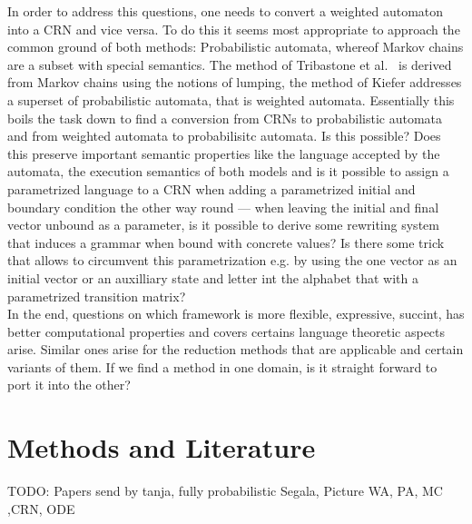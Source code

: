 \documentclass[11pt, rgb]{scrartcl}
\begin{document}
In order to address this questions, one needs to convert a weighted automaton into a CRN and vice versa. To do this it seems most appropriate to approach the common ground of both methods: Probabilistic automata, whereof Markov chains are a subset with special semantics. The method of Tribastone et al.~\autocite{Cardelli2017MaximalAO} is derived from Markov chains using the notions of lumping, the method of Kiefer addresses a superset of probabilistic automata, that is weighted automata. Essentially this boils the task down to find a conversion from CRNs to probabilistic automata and from weighted automata to probabilisitc automata. Is this possible? Does this preserve important semantic properties like the language accepted by the automata, the execution semantics of both models and is it possible to assign a parametrized language to a CRN when adding a parametrized initial and boundary condition the other way round --- when leaving the initial and final vector unbound as a parameter, is it possible to derive some rewriting system that induces a grammar when bound with concrete values? Is there some trick that allows to circumvent this parametrization e.g. by using the one vector as an initial vector or an auxilliary state and letter int the alphabet that with a parametrized transition matrix? \\

In the end, questions on which framework is more flexible, expressive, succint, has better computational properties and covers certains language theoretic aspects arise. Similar ones arise for the reduction methods that are applicable and certain variants of them. If we find a method in one domain, is it straight forward to port it into the other?


\section{Methods and Literature}
TODO: Papers send by tanja, fully probabilistic Segala, Picture WA, PA, MC ,CRN, ODE





\printbibliography
\end{document}
